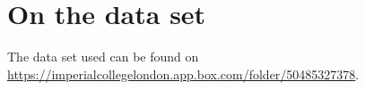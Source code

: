 %
%
%
%
%
%
%
%
%
\chapter{On the data set}

The data set used can be found on \url{https://imperialcollegelondon.app.box.com/folder/50485327378}.

